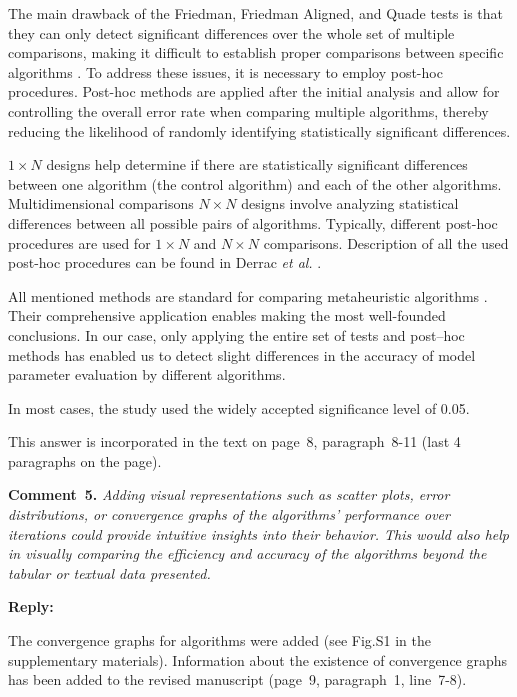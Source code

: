 \documentclass[a4paper,fleqn]{cas-sc}
\begin{document}
The main drawback of the Friedman, Friedman Aligned, and Quade tests is that
they can only detect significant differences over the whole set of multiple comparisons,
making it difficult to establish proper comparisons between specific algorithms \cite{Derrac2011}.
To address these issues, it is necessary to employ post-hoc procedures.
Post-hoc methods are applied after the initial analysis and allow for controlling the overall error rate
when comparing multiple algorithms, thereby reducing the likelihood of randomly identifying statistically significant differences.

$1\times N$ designs help determine if there are statistically significant differences between one algorithm
(the control algorithm) and each of the other algorithms.
Multidimensional comparisons $N\times N$ designs involve analyzing statistical differences between all possible pairs of algorithms.
Typically, different post-hoc procedures are used for $1\times N$ and $N\times N$ comparisons.
Description of all the used post-hoc procedures can be found in Derrac \emph{et al.} \cite{Derrac2011}.

All mentioned methods are standard for comparing metaheuristic algorithms \cite{Derrac2011}.
Their comprehensive application enables making the most well-founded conclusions.
In our case, only applying the entire set of tests and post--hoc methods
has enabled us to detect slight differences in the accuracy of model parameter evaluation by different algorithms.

In most cases, the study used the widely accepted significance level of 0.05.

This answer is incorporated in the text on page~8, paragraph~8-11 (last 4 paragraphs on the page).



\vspace{1cm}
\noindent
\textcolor[rgb]{0.00,0.50,1.00}{\textbf{Comment~5.}}
\emph{ Adding visual representations such as scatter plots, error distributions,
or convergence graphs of the algorithms' performance over iterations could provide intuitive insights into their behavior.
This would also help in visually comparing the efficiency and accuracy of the algorithms beyond the tabular or textual data presented.}

\noindent
\textcolor[rgb]{0.51,0.00,0.00}{\textbf{Reply:}}

The convergence graphs for  algorithms were added (see Fig.S1 in the supplementary materials).
Information about the existence of convergence graphs has been added to the revised manuscript 
(page~9, paragraph~1, line~7-8).
\end{document}

